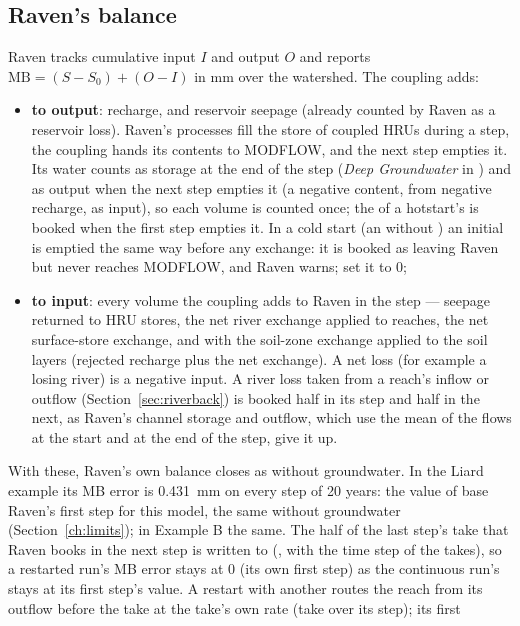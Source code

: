 \subsection{Raven's balance}\label{sec:accraven}
Raven tracks cumulative input $I$ and output $O$ and reports $\mathrm{MB}=\left(S-S_0\right)+\left(O-I\right)$ in mm over
the watershed. The coupling adds:
\begin{itemize}
\item \textbf{to output}: recharge, and reservoir seepage (already counted by Raven as a reservoir loss). Raven's processes
fill the  store of coupled HRUs during a step, the coupling hands its contents to MODFLOW, and the next
step empties it. Its water counts as storage at the end of the step (\emph{Deep Groundwater} in
) and as output when the next step empties it (a negative content, from negative
recharge, as input), so each volume is counted once; the  of a hotstart's  is booked when the
first step empties it. In a cold start (an  without ) an initial  is emptied the
same way before any exchange: it is booked as leaving Raven but never reaches MODFLOW, and Raven warns; set it to 0;
\item \textbf{to input}: every volume the coupling adds to Raven in the step --- seepage returned to HRU stores, the net
river exchange applied to reaches, the net surface-store exchange, and with  the soil-zone
exchange applied to the soil layers (rejected recharge plus the net exchange). A net loss (for example a losing river)
is a negative input. A river loss taken from a reach's inflow or outflow (Section~\ref{sec:riverback}) is booked half in
its step and half in the next, as Raven's channel storage and outflow, which use the mean of the flows at the start and
at the end of the step, give it up.
\end{itemize}
With these, Raven's own balance closes as without groundwater. In the Liard example its MB error is 0.431~mm on every
step of 20 years: the value of base Raven's first step for this model, the same without groundwater
(Section~\ref{ch:limits}); in Example B the same. The half of the last step's take that Raven books in the next step is
written to  (, with the time step of the takes), so a restarted run's MB error stays
at 0 (its own first step) as the continuous run's stays at its first step's value. A restart with another
 routes the reach from its outflow before the take at the take's own rate (take over its step); its first
